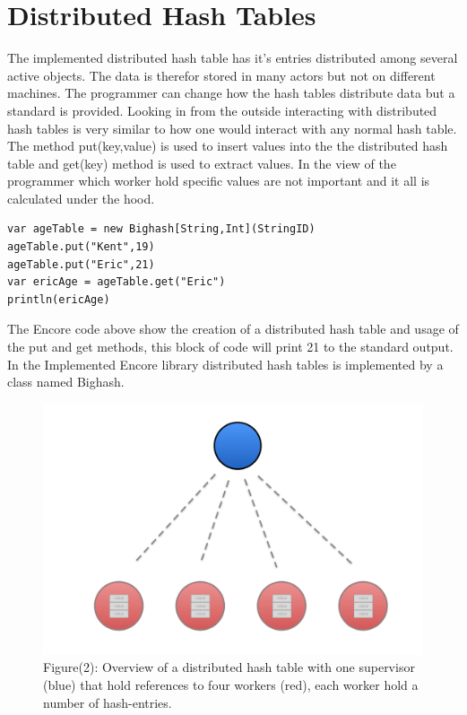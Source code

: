 \section{Distributed Hash Tables}
The implemented distributed hash table has it's entries distributed among several active objects. The data is therefor stored in many actors but not on different machines. The programmer can change how the hash tables distribute data but a standard is provided. Looking in from the outside interacting with distributed hash tables is very similar to how one would interact with any normal hash table. The method put(key,value) is used to insert values into the the distributed hash table and get(key) method is used to extract values. In the view of the programmer which worker hold specific values are not important and it all is calculated under the hood. 

\begin{lstlisting}
var ageTable = new Bighash[String,Int](StringID)
ageTable.put("Kent",19)
ageTable.put("Eric",21)
var ericAge = ageTable.get("Eric")
println(ericAge)
\end{lstlisting}

The Encore code above show the creation of a distributed hash table and usage of the put and get methods, this block of code will print 21 to the standard output. In the Implemented Encore library distributed hash tables is implemented by a class named Bighash. \\

\begin{figure}[h]
\includegraphics[width=12cm]{images/originalFigure}
Figure(2): Overview of a distributed hash table with one supervisor (blue) that hold references to four workers (red), each worker hold a number of hash-entries.
\end{figure}

